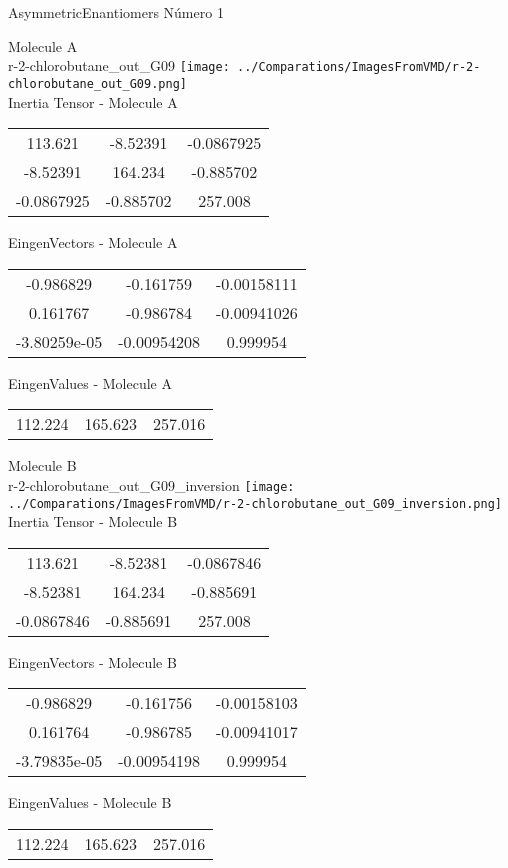 
\vtab[-2cm]
\begin{center}
{\large AsymmetricEnantiomers \tab Número 1}
\end{center}
\begin{multicols}{2}
\begin{center}

Molecule A \\ 
r-2-chlorobutane\_out\_G09
\texttt{[image: ../Comparations/ImagesFromVMD/r-2-chlorobutane\_out\_G09.png]}
\\
Inertia Tensor - Molecule A \\
\vtab

\begin{tabular}{|c c c|}
113.621	 & 	-8.52391	 & 	-0.0867925	 \\
-8.52391	 & 	164.234	 & 	-0.885702	 \\
-0.0867925	 & 	-0.885702	 & 	257.008
\end{tabular}

\vtab
 EingenVectors - Molecule A     \\
\vtab
\begin{tabular}{|c c c|}
-0.986829	 & 	-0.161759	 & 	-0.00158111	 \\
0.161767	 & 	-0.986784	 & 	-0.00941026	 \\
-3.80259e-05	 & 	-0.00954208	 & 	0.999954
\end{tabular}

\vtab
 EingenValues - Molecule A     \\
\vtab
\begin{tabular}{|c c c|}
112.224	 & 	165.623	 & 	257.016	 \\
\end{tabular}
\columnbreak

Molecule B \\ 
r-2-chlorobutane\_out\_G09\_inversion
\texttt{[image: ../Comparations/ImagesFromVMD/r-2-chlorobutane\_out\_G09\_inversion.png]}
\\
Inertia Tensor - Molecule B \\
\vtab

\begin{tabular}{|c c c|}
113.621	 & 	-8.52381	 & 	-0.0867846	 \\
-8.52381	 & 	164.234	 & 	-0.885691	 \\
-0.0867846	 & 	-0.885691	 & 	257.008
\end{tabular}

\vtab
 EingenVectors - Molecule B     \\
\vtab
\begin{tabular}{|c c c|}
-0.986829	 & 	-0.161756	 & 	-0.00158103	 \\
0.161764	 & 	-0.986785	 & 	-0.00941017	 \\
-3.79835e-05	 & 	-0.00954198	 & 	0.999954
\end{tabular}

\vtab
 EingenValues - Molecule B     \\
\vtab
\begin{tabular}{|c c c|}
112.224	 & 	165.623	 & 	257.016	 \\
\end{tabular}

\end{center}
\end{multicols}
